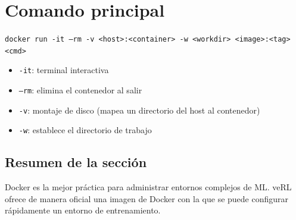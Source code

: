 \section{Comando principal}
\texttt{docker run -it --rm -v <host>:<container> -w <workdir> <image>:<tag> <cmd>}
\begin{itemize}
  \item \texttt{-it}: terminal interactiva
  \item \texttt{--rm}: elimina el contenedor al salir
  \item \texttt{-v}: montaje de disco (mapea un directorio del host al contenedor)
  \item \texttt{-w}: establece el directorio de trabajo
\end{itemize}

\subsection{Resumen de la sección}
Docker es la mejor práctica para administrar entornos complejos de ML. veRL ofrece de manera oficial una imagen de Docker con la que se puede configurar rápidamente un entorno de entrenamiento.

\newpage
